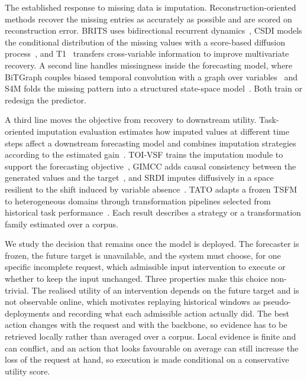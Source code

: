 \documentclass{article}
\newcommand{\tsfm}{TSFM}
\begin{document}
The established response to missing data is imputation. Reconstruction-oriented methods
recover the missing entries as accurately as possible and are scored on reconstruction error.
BRITS uses bidirectional recurrent dynamics~\citep{cao2018brits}, CSDI models the conditional
distribution of the missing values with a score-based diffusion
process~\citep{tashiro2021csdi}, and T1~\citep{park2026t1} transfers cross-variable
information to improve multivariate recovery. A second line handles missingness inside the
forecasting model, where BiTGraph couples biased temporal convolution with a graph over
variables~\citep{chen2024bitgraph} and S4M folds the missing pattern into a structured
state-space model~\citep{peng2025s4m}. Both train or redesign the predictor.

A third line moves the objective from recovery to downstream utility. Task-oriented imputation
evaluation estimates how imputed values at different time steps affect a downstream
forecasting model and combines imputation strategies according to the estimated
gain~\citep{wang2024taskoriented}. TOI-VSF trains the imputation module to support the
forecasting objective~\citep{hao2025toivsf}, GIMCC adds causal consistency between the
generated values and the target~\citep{hao2025gimcc}, and SRDI imputes diffusively in a space
resilient to the shift induced by variable absence~\citep{xu2026srdi}. TATO adapts a frozen
\tsfm{} to heterogeneous domains through transformation pipelines selected from historical
task performance~\citep{qiu2026tato}. Each result describes a strategy or a transformation
family estimated over a corpus.

We study the decision that remains once the model is deployed. The forecaster is frozen, the
future target is unavailable, and the system must choose, for one specific incomplete request,
which admissible input intervention to execute or whether to keep the input unchanged. Three
properties make this choice non-trivial. The realised utility of an intervention depends on
the future target and is not observable online, which motivates replaying historical windows
as pseudo-deployments and recording what each admissible action actually did. The best action
changes with the request and with the backbone, so evidence has to be retrieved locally rather
than averaged over a corpus. Local evidence is finite and can conflict, and an action that
looks favourable on average can still increase the loss of the request at hand, so execution
is made conditional on a conservative utility score.
\end{document}
